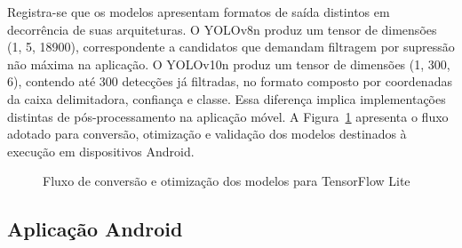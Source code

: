 \documentclass[artigo,times,capa]{iftex2024}
\begin{document}
Registra-se que os modelos apresentam formatos de saída distintos em decorrência de suas arquiteturas. O YOLOv8n produz um tensor de dimensões (1, 5, 18900), correspondente a candidatos que demandam filtragem por supressão não máxima na aplicação. O YOLOv10n produz um tensor de dimensões (1, 300, 6), contendo até 300 detecções já filtradas, no formato composto por coordenadas da caixa delimitadora, confiança e classe. Essa diferença implica implementações distintas de pós-processamento na aplicação móvel. A Figura~\ref{fig:fluxo_tflite} apresenta o fluxo adotado para conversão, otimização e validação dos modelos destinados à execução em dispositivos Android.

\begin{figure}[H]
\centering
\caption{Fluxo de conversão e otimização dos modelos para TensorFlow Lite}
\label{fig:fluxo_tflite}
\vspace{1.2\baselineskip}
\end{figure}

\subsection{Aplicação Android}
\label{sec:aplicacao_android}
 
\end{document}
